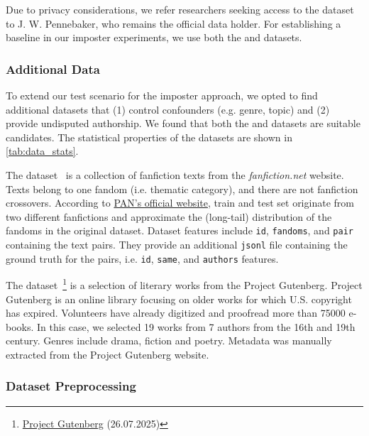 Due to privacy considerations, we refer researchers seeking access to the \dataStudent{} dataset to J. W. Pennebaker, 
who remains the official data holder. 
For establishing a baseline in our imposter experiments, we use both the \dataBlog{} and \dataStudent{} datasets.


\subsubsection{Additional Data}
To extend our test scenario for the imposter approach, we opted to find additional datasets that 
(1) control confounders (e.g. genre, topic) and (2) provide undisputed authorship.
We found that both the \dataPan{} and \dataGutenberg{} datasets are suitable candidates.
The statistical properties of the datasets are shown in \autoref{tab:data_stats}.

The \dataPan{} dataset~\citep{bischoff_importance_2020} is a collection of fanfiction texts from the \textit{fanfiction.net} website.
Texts belong to one fandom (i.e. thematic category), and there are not fanfiction crossovers.
According to \href{https://pan.webis.de/clef20/pan20-web/author-identification.html}{PAN's official website}, 
train and test set originate from two different fanfictions and approximate the (long-tail) distribution of the fandoms in the original dataset.
Dataset features include \texttt{id}, \texttt{fandoms}, and \texttt{pair} containing the text pairs.
They provide an additional \texttt{jsonl} file containing the ground truth for the pairs, 
i.e. \texttt{id}, \texttt{same}, and \texttt{authors} features.

The \dataGutenberg{} dataset~\footnote{\href{https://www.gutenberg.org/}{Project Gutenberg} (26.07.2025)} 
is a selection of literary works from the Project Gutenberg.
Project Gutenberg is an online library focusing on older works for which U.S. copyright has expired.
Volunteers have already digitized and proofread more than \num{75000} e-books.
In this case, we selected 19 works from 7 authors from the 16th and 19th century.
Genres include drama, fiction and poetry.
Metadata was manually extracted from the Project Gutenberg website.


\subsubsection{Dataset Preprocessing}
\label{subsubsec:dataset_preprocessing}

